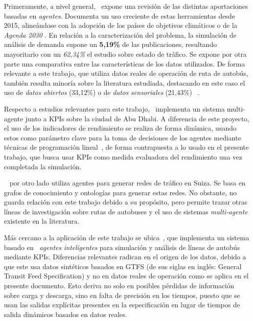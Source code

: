 Primeramente, a nivel general,~\textcite{divassonj2025abm} expone una revisión de las distintas aportaciones basadas
en \textit{agentes}. Documenta un uso creciente de estas herramientas desde 2015, alineándose con la adopción de los países
de objetivos climáticos o de la \textit{Agenda 2030} \cite{onu_ods}. En relación a la caracterización del problema, la simulación de análisis de demanda
supone un \textbf{5,19\%} de las publicaciones, resultando mayoritario con un \textit{62,34\%} el estudio sobre estado
de tráfico. Se expone por otra parte una comparativa entre las características de los datos utilizados.
De forma relevante a este trabajo, que utiliza datos reales de operación de ruta de autobús, también resulta minoría sobre la
literatura estudiada, destacando en este caso el uso de \textit{datos abiertos} (33,12\%) o de \textit{datos sensoriales} (21,43\%)
~\cite{divassonj2025abm}.

Respecto a estudios relevantes para este trabajo,~\textcite{morri2021control} implementa un sistema multi-agente
junto a KPIs sobre la ciudad de Abu Dhabi. A diferencia de este proyecto, el uso de los indicadores de rendimiento se 
realiza de forma dinámica, usando estos como parámetro clave para la toma de decisiones de los agentes 
mediante técnicas de programación lineal~\cite{morri2021control},
de forma contrapuesta a lo usado en el presente trabajo, que busca usar KPIs como medida evaluadora del rendimiento una vez
completada la simulación.

~\textcite{chambers2024autonomous} por otro lado utiliza agentes para generar redes de tráfico en Suiza. Se basa en grafos
de conocimiento y ontologías para generar estas redes. No obstante, no guarda relación con este trabajo debido a su propósito,
pero permite trazar otras líneas de investigación sobre rutas de autobuses y el uso de sistemas \textit{multi-agente} existente
en la literatura.

Más cercano a la aplicación de este trabajo se ubica~\textcite{Fanfani2025FastAgent}, que implementa un sistema basado en 
~\textit{agentes inteligentes} para simulación y análisis de líneas de autobús mediante KPIs. Diferencias relevantes radican
en el origen de los datos, debido a que este usa datos sintéticos basados en GTFS (de sus siglas en inglés: General Transit 
Feed Specification) y no en datos reales de operación como se aplica en el presente documento. Esto deriva no solo en 
posibles pérdidas de información sobre carga y descarga, sino en falta de precisión en los tiempos, puesto que se usan las 
salidas explícitas presentes en la especificación en lugar de tiempos de salida dinámicos basados en datos reales.

